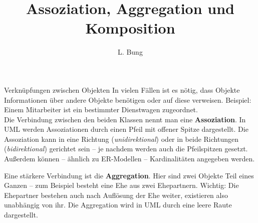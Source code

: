 \documentclass[11pt, a4paper, oneside]{article}
\begin{document}
	\author{L. Bung}
	\title{Assoziation, Aggregation \hspace{10cm} und Komposition}
	\subject{SAE}
	\maketitle
	
	\begin{hint}{Verknüpfungen zwischen Objekten}
		In vielen Fällen ist es nötig, dass Objekte Informationen über andere Objekte benötigen oder auf diese verweisen.
		Beispiel: Einem Mitarbeiter ist ein bestimmter Dienstwagen zugeordnet.\\
		
		Die Verbindung zwischen den beiden Klassen nennt man eine \textbf{Assoziation}.
		In UML werden Assoziationen durch einen Pfeil mit offener Spitze dargestellt.
		Die Assoziation kann in eine Richtung (\emph{unidirektional}) oder in beide Richtungen (\emph{bidirektional}) gerichtet sein -- je nachdem werden auch die Pfeilspitzen gesetzt.
		Außerdem können -- ähnlich zu ER-Modellen -- Kardinalitäten angegeben werden.
		
		\begin{center}
		\end{center}
		
		Eine stärkere Verbindung ist die \textbf{Aggregation}.
		Hier sind zwei Objekte Teil eines Ganzen -- zum Beispiel besteht eine Ehe aus zwei Ehepartnern.
		Wichtig: Die Ehepartner bestehen auch nach Auflösung der Ehe weiter, existieren also unabhängig von ihr.
		Die Aggregation wird in UML durch eine leere Raute dargestellt.
		
		\begin{center}
			\begin{tikzpicture}
				

\end{tikzpicture}
\end{center}
\end{hint}
\end{document}
